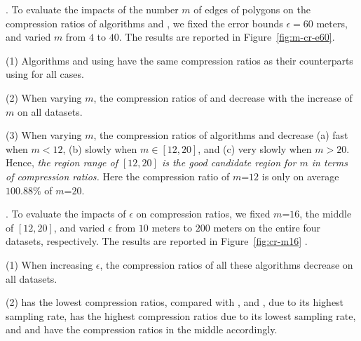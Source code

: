 .
To evaluate the impacts of   the number $m$ of edges of polygons on the compression ratios of algorithms \cist and \cista, we fixed the error bounds {$\epsilon =60$ meters}, and varied $m$ from $4$ to $40$. The results are reported in Figure~\ref{fig:m-cr-e60}.

\ni(1) Algorithms \cist and \cista using \rpia have the same compression ratios as their counterparts using \cpia for all cases.

\ni(2) When varying $m$, the compression ratios of \cist and \cista decrease with the increase of $m$ on all datasets.

\ni(3) When varying $m$, the compression ratios of algorithms \cist and \cista decrease (a) fast when $m < 12$, (b) slowly when $m \in [12, 20]$, and (c) very slowly when $m > 20$. Hence, \emph{the region range of $[12, 20]$ is the good candidate region for $m$ in terms of compression ratios.}
Here the compression ratio of $m$=$12$ is only on average {$100.88\%$} of $m$=$20$.



.
To evaluate the impacts of $\epsilon$ on compression ratios, we fixed {$m$=$16$}, the middle of $[12, 20]$, and varied $\epsilon$ from $10$ meters to $200$ meters on the entire four datasets, respectively.
The results are reported in Figure~\ref{fig:cr-m16} .


\ni (1) When increasing $\epsilon$, the compression ratios of all these algorithms decrease on all datasets.

\ni (2) \pricar has the lowest compression ratios, compared with \truck, \sercar and \geolife, due to its highest sampling rate,
\truck has the highest compression ratios due to its lowest sampling rate, and \sercar and \geolife have the compression ratios in the middle accordingly.

